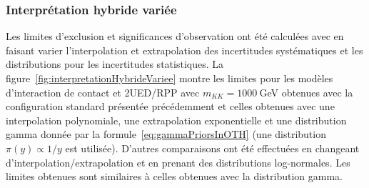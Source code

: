 \subsubsection{Interpr\'etation hybride vari\'ee}
\label{sec:variationInterpretationFourTopHybride}

Les limites d'exclusion et significances d'observation ont \'et\'e calcul\'ees avec \opthylic{} en faisant varier l'interpolation et extrapolation des incertitudes syst\'ematiques et les distributions \prior{} pour les incertitudes statistiques. La figure~\ref{fig:interpretationHybrideVariee} montre les limites pour les mod\`eles d'interaction de contact et 2UED/RPP avec $m_{KK}=1000~$GeV obtenues avec la configuration standard pr\'esent\'ee pr\'ec\'edemment et celles obtenues avec une interpolation polynomiale, une extrapolation exponentielle et une distribution \prior{} gamma donn\'ee par la formule~\ref{eq:gammaPriorsInOTH} (une distribution \prior{} $\pi\left(y\right)\propto 1/y$ est utilis\'ee). D'autres comparaisons ont \'et\'e effectu\'ees en changeant d'interpolation/extrapolation et en prenant des distributions \prior{} log-normales. 
Les limites obtenues sont similaires \`a celles obtenues avec la distribution gamma.


